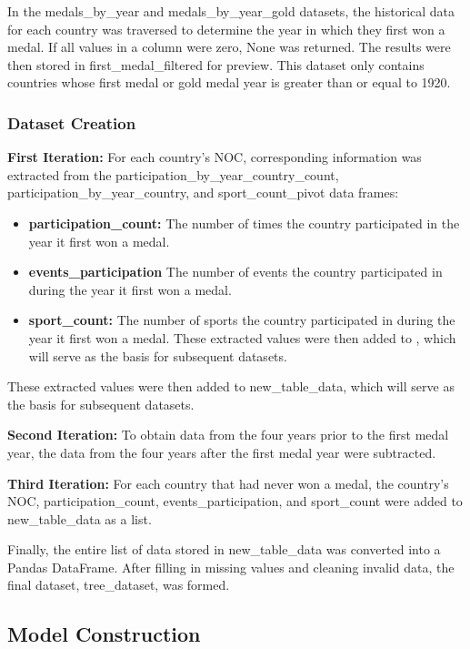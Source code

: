 \documentclass{mcmthesis}
\begin{document}
    In the medals\_by\_year and medals\_by\_year\_gold datasets, the historical data for each country was traversed to determine the year in which they first won a medal. If all values in a column were zero, None was returned. The results were then stored in first\_medal\_filtered for preview. This dataset only contains countries whose first medal or gold medal year is greater than or equal to 1920.

\subsubsection{Dataset Creation}

{\bf First Iteration:}
    For each country's NOC, corresponding information was extracted from the participation\_by\_year\_country\_count, participation\_by\_year\_country, and sport\_count\_pivot data frames:
\begin{itemize}   
\item {\bf participation\_count:} The number of times the country participated in the year it first won a medal.
\item {\bf events\_participation} The number of events the country participated in during the year it first won a medal.
\item {\bf sport\_count: }The number of sports the country participated in during the year it first won a medal.
These extracted values were then added to , which will serve as the basis for subsequent datasets.
\end{itemize}

These extracted values were then added to new\_table\_data, which will serve as the basis for subsequent datasets.

{\bf Second Iteration:}
    To obtain data from the four years prior to the first medal year, the data from the four years after the first medal year were subtracted.

{\bf Third Iteration:}
    For each country that had never won a medal, the country's NOC, participation\_count, events\_participation, and sport\_count were added to new\_table\_data as a list.

    Finally, the entire list of data stored in new\_table\_data was converted into a Pandas DataFrame. After filling in missing values and cleaning invalid data, the final dataset, tree\_dataset, was formed.

\subsection{ Model Construction}
\end{document}
